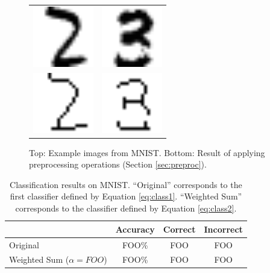 \documentclass[oribibl]{llncs}
\begin{document}
\begin{figure}
\centering
\begin{tabular}{cc}
\includegraphics[width=.2\linewidth]{figs/Imnist_3749.png} & \includegraphics[width=.2\linewidth]{figs/Imnist_1960.png} \\
\includegraphics[width=.2\linewidth]{figs/Imnist_proc_1.png} & \includegraphics[width=.2\linewidth]{figs/Imnist_proc_16.png} \\
\end{tabular}
\caption{Top: Example images from MNIST. Bottom: Result of applying preprocessing operations (Section \ref{sec:preproc}).}
\label{fig:mnist_imgs}
\end{figure}

\begin{table}
\centering
  \begin{tabular}{ l || c | c | c }
  & Accuracy & Correct & Incorrect \\ \hline
    Original &  FOO\% & FOO & FOO \\ \hline
    Weighted Sum ($\alpha = FOO$) & FOO\% & FOO & FOO \\
  \end{tabular}
\vspace{1em}
\caption{Classification results on MNIST. ``Original'' corresponds to the first classifier defined by Equation \ref{eq:class1}. ``Weighted Sum'' corresponds to the classifier defined by Equation \ref{eq:class2}.}
\label{tab:results}
\end{table}
\end{document}
